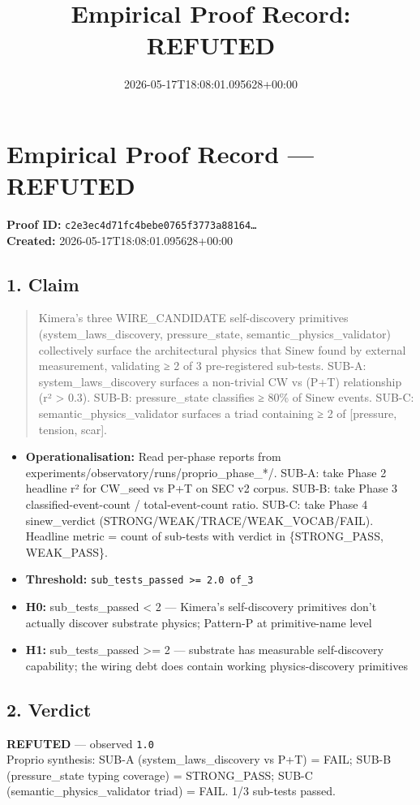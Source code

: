 \documentclass{article}
\title{Empirical Proof Record: REFUTED}
\date{2026-05-17T18:08:01.095628+00:00}
\begin{document}
\maketitle
\section*{Empirical Proof Record --- \textcolor{refuted}{\textbf{REFUTED}}}
\textbf{Proof ID:} \texttt{c2e3ec4d71fc4bebe0765f3773a88164\dots}\\
\textbf{Created:} 2026-05-17T18:08:01.095628+00:00
\subsection*{1. Claim}
\begin{quote}Kimera's three WIRE\_CANDIDATE self-discovery primitives (system\_laws\_discovery, pressure\_state, semantic\_physics\_validator) collectively surface the architectural physics that Sinew found by external measurement, validating ≥ 2 of 3 pre-registered sub-tests. SUB-A: system\_laws\_discovery surfaces a non-trivial CW vs (P+T) relationship (r² > 0.3). SUB-B: pressure\_state classifies ≥ 80\% of Sinew events. SUB-C: semantic\_physics\_validator surfaces a triad containing ≥ 2 of [pressure, tension, scar].\end{quote}
\begin{itemize}
\item \textbf{Operationalisation:} Read per-phase reports from experiments/observatory/runs/proprio\_phase\_*/. SUB-A: take Phase 2 headline r² for CW\_seed vs P+T on SEC v2 corpus. SUB-B: take Phase 3 classified-event-count / total-event-count ratio. SUB-C: take Phase 4 sinew\_verdict (STRONG/WEAK/TRACE/WEAK\_VOCAB/FAIL). Headline metric = count of sub-tests with verdict in \{STRONG\_PASS, WEAK\_PASS\}.
\item \textbf{Threshold:} \texttt{sub\_tests\_passed >= 2.0 of\_3}
\item \textbf{H0:} sub\_tests\_passed < 2 — Kimera's self-discovery primitives don't actually discover substrate physics; Pattern-P at primitive-name level
\item \textbf{H1:} sub\_tests\_passed >= 2 — substrate has measurable self-discovery capability; the wiring debt does contain working physics-discovery primitives
\end{itemize}
\subsection*{2. Verdict}
\textcolor{refuted}{\textbf{REFUTED}} --- observed \texttt{1.0}\\
Proprio synthesis: SUB-A (system\_laws\_discovery vs P+T) = FAIL; SUB-B (pressure\_state typing coverage) = STRONG\_PASS; SUB-C (semantic\_physics\_validator triad) = FAIL. 1/3 sub-tests passed.
\end{document}
